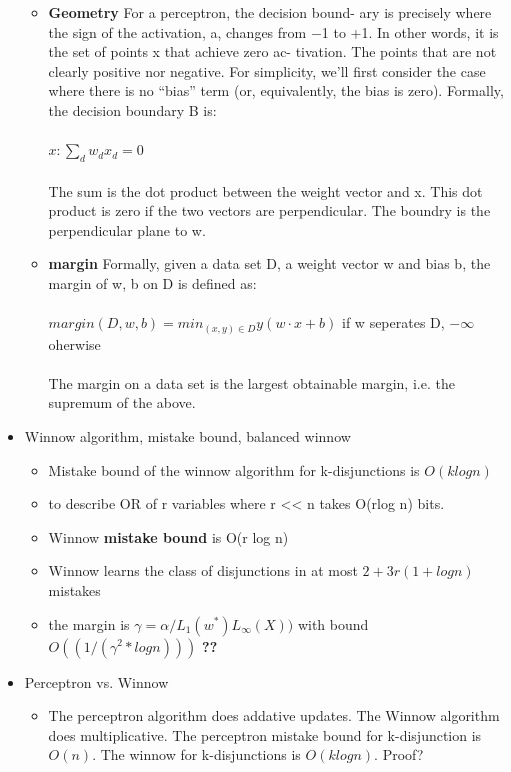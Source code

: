 \documentclass{article}
\begin{document}
\begin{itemize}
\begin{itemize}
\begin{center}
	
	\end{center}
	\item \textbf{Geometry} For a perceptron, the decision bound- ary is precisely where the sign of the activation, a, changes from −1 to +1. In other words, it is the set of points x that achieve zero ac- tivation. The points that are not clearly positive nor negative. For simplicity, we’ll first consider the case where there is no “bias” term (or, equivalently, the bias is zero). Formally, the decision boundary B is:\\
	\\$x:\sum_{d}w_dx_d = 0$\\
	\\The sum is the dot product between the weight vector and x. This  dot product is zero if the two vectors are perpendicular. The boundry is the perpendicular plane to w.
	\item \textbf{margin} Formally, given a data set D, a weight vector w and bias b, the margin of w, b on D is defined as:\\
	\\$margin(D,w,b) = min_{(x,y)\in D}y(w\cdot x + b)$ if w seperates D, $-\infty$ oherwise\\
	\\The margin on a data set is the largest obtainable margin, i.e. the supremum of the above.
	\end{itemize}
\item Winnow algorithm, mistake bound, balanced winnow
	\begin{itemize}
	\item Mistake bound of the winnow algorithm for k-disjunctions is $O(klogn)$
	\item to describe OR of r variables where r << n  takes O(rlog n) bits.
	\item Winnow \textbf{mistake bound} is O(r log n)
	\item Winnow learns the class of disjunctions in at most $2+3r(1+logn)$ mistakes
	\item the margin is $\gamma = \alpha / L_1 (w^*)L_{\infty}(X))$ with bound $O((1/(\gamma^{2}*logn)))$ \textbf{??}
	\end{itemize}
\item Perceptron vs. Winnow
	\begin{itemize}
	\item The perceptron algorithm does addative updates. The Winnow algorithm does multiplicative. The perceptron mistake bound for k-disjunction is $O(n)$. The winnow for k-disjunctions is $O(klogn)$. Proof?

\end{itemize}
\end{itemize}
\end{document}
